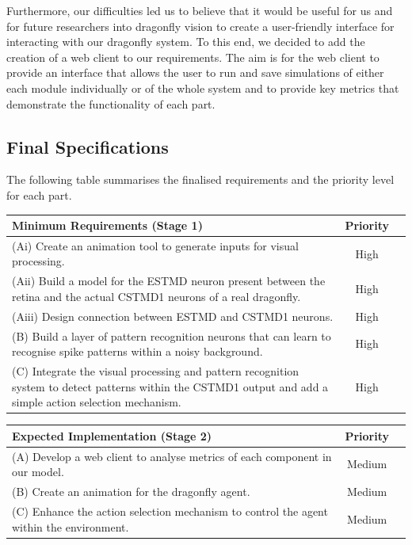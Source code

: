 \documentclass[a4paper,11pt]{article}
\begin{document}
	Furthermore, our difficulties led us to believe that it would be useful for us and for future researchers into dragonfly vision to create a user-friendly interface for interacting with our dragonfly system. To this end, we decided to add the creation of a web client to our requirements. The aim is for the web client to provide an interface that allows the user to run and save simulations of either each module individually or of the whole system and to provide key metrics that demonstrate the functionality of each part.
	
\subsection{Final Specifications}
The following table summarises the finalised requirements and the priority level for each part.
\begin{center}
    \begin{tabular}{p{12cm} c c}
    \textbf{Minimum Requirements (Stage 1)} & \textbf{Priority} \\ \hline
    (Ai) Create an animation tool to generate inputs for visual processing. & High \\ 
	(Aii) Build a model for the ESTMD neuron present between the retina and the actual CSTMD1 neurons of a real dragonfly. & High \\
	(Aiii) Design connection between ESTMD and CSTMD1 neurons. & High \\
	(B) Build a layer of pattern recognition neurons that can learn to recognise spike patterns within a noisy background. & High\\
	(C) Integrate the visual processing and pattern recognition system to detect patterns within the CSTMD1 output and add a simple action selection mechanism. & High\\
    \end{tabular}
\end{center}

\begin{center}
    \begin{tabular}{p{12cm} c c}
    \textbf{Expected Implementation (Stage 2)} & \textbf{Priority} \\ \hline
	(A) Develop a web client to analyse metrics of each component in our model. & Medium \\
	(B) Create an animation for the dragonfly agent. & Medium\\
	(C) Enhance the action selection mechanism to control the agent within the environment. & Medium\\
    \end{tabular}
\end{center}
\end{document}
